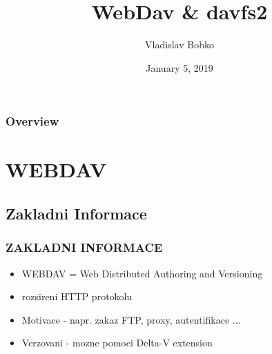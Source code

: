 \documentclass{beamer}
\title[Webdav]{WebDav \& davfs2 } %
\author{Vladislav Bobko} %
\institute[FIT CVUT] 
{
Ceske Vysoke Uceni Technicke \\ %
\medskip
\textit{bobkovla@fitcvut.cz} %
}
\date{ January 5, 2019} %
\begin{document}
\begin{frame}
\titlepage %
\end{frame}

\begin{frame}
\frametitle{Overview} %
\tableofcontents %
\end{frame}


\section{WEBDAV} %

\subsection{Zakladni Informace} %
\begin{frame}
\frametitle{ZAKLADNI INFORMACE }
    \begin{itemize}
        \item WEBDAV = Web Distributed Authoring and Versioning
        \item rozsireni HTTP protokolu
        \item Motivace - napr. zakaz FTP, proxy, autentifikace ...
        \item Verzovani - mozne pomoci Delta-V extension
    \end{itemize}
\end{frame}
\end{document}
